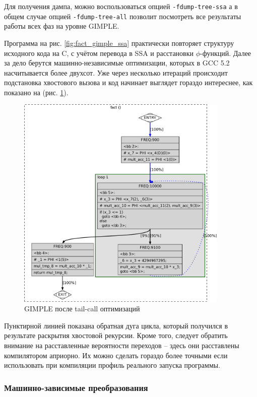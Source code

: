 \documentclass[a4paper,12pt,oneside]{article}
\begin{document}
Для получения дампа, можно воспользоваться опцией \lstinline!-fdump-tree-ssa! а в общем случае опцией \lstinline!-fdump-tree-all! позволит посмотреть все результаты работы всех фаз на уровне GIMPLE.

Программа на рис. \ref{fig:fact_gimple_ssa} практически повторяет структуру исходного кода на C, с учётом перевода в SSA и расстановки $\phi$-функций. Далее за дело берутся машинно-независимые оптимизации, которых в GCC 5.2 насчитывается более двухсот. Уже через несколько итераций происходит подстановка хвостового вызова и код начинает выглядет гораздо интереснее, как показано на (рис. \ref{fig:fact_gimple_release_ssa}).

\begin{figure}[ht]
\centering
\includegraphics[width=0.9\textwidth]{illustrations/fact-release_ssa-crop.pdf}
\caption{GIMPLE после tail-call оптимизаций}
\label{fig:fact_gimple_release_ssa}
\end{figure}

Пунктирной линией показана обратная дуга цикла, который получился в результате раскрытия хвостовой рекурсии. Кроме того, следует обратить внимание на расставленные вероятности переходов -- здесь они расставлены компилятором априорно. Их можно сделать гораздо более точными если использовать при компиляции профиль реального запуска программы.

\subsubsection{Машинно-зависимые преобразования}
\end{document}
